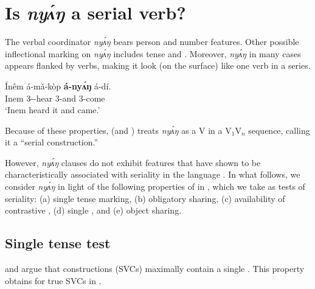 \documentclass[output=paper,modfonts,nonflat,
hidelinks
]{langsci/langscibook}
\begin{document}
\section{Is \textit{ny\'{ʌ}ŋ} a serial verb?}\label{sec:duncan-et-al:2}

The verbal coordinator \textit{ny\'{ʌ}ŋ} bears person and number features. Other possible inflectional marking on \textit{ny\'{ʌ}ŋ} includes tense and  \citep{essien1985negation,essien1990grammar}. Moreover, \textit{ny\'{ʌ}ŋ} in many cases appears flanked by verbs, making it look (on the surface) like one verb in a series.

\ea\label{ex:duncan-et-al:4}
\gll \'{I}nêm á-m\v{a}-k\`{o}p \textbf{á-ny\'{ʌ}ŋ} á-dí. \\
Inem 3{\SG-\PST}-hear 3{\SG}-and 3{\SG}-come \\
\glt ‘Inem heard it and came.’ \citep[86]{essien1985negation}
\z


\noindent Because of these properties, \citet[86]{essien1985negation} (and \citealt[142]{essien1990grammar}) treats \textit{ny\'{ʌ}ŋ} as a V in a V$_1$V$_n$ sequence, calling it a ``serial construction.''

However,  \textit{ny\'{ʌ}ŋ} clauses do not exhibit features that have shown to be characteristically associated with seriality in the language \citep{major2015serial,duncan2016parallel}. In what follows, we consider \textit{ny\'{ʌ}ŋ} in light of the following properties of  in , which we take as tests of seriality: (a) single tense marking, (b) obligatory  sharing, (c) availability of contrastive , (d) single , and (e) object sharing. 

\subsection{Single tense test}\label{sec:duncan-et-al:2.1}

\citet{collins1997argument} and \citet{hiraiwa2008object} argue that  constructions (SVCs) maximally contain a single . This property obtains for true SVCs in  \citep{major2015serial}.

\ea\label{ex:duncan-et-al:5}
\z
\z
\end{document}
